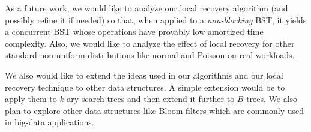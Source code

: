 As a future work, we would like to analyze our local recovery algorithm (and possibly refine it if needed) so that, when applied to a \emph{non-blocking} BST, it yields a concurrent BST whose operations have provably low amortized time complexity. Also, we would like to analyze the effect of local recovery for other standard non-uniform distributions like normal and Poisson on real workloads.

We also would like to extend the ideas used in our algorithms and our local recovery technique to other data structures. A simple extension would be to apply them to $k$-ary search trees and then extend it further to $B$-trees. We also plan to explore other data structures like Bloom-filters which are commonly used in big-data applications.